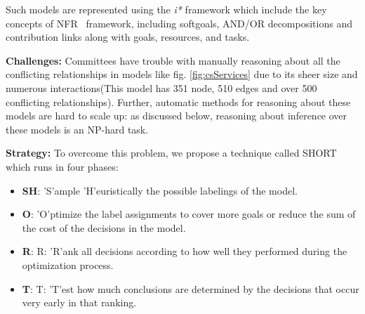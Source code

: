 \documentclass[table, xcdraw, sigconf,review, anonymous]{acmart}
\begin{document}
Such models are represented using the \textit{i*} framework \cite{yu97a} which include the key concepts of NFR~\cite{mylopoulos92.nfr} framework, including softgoals, AND/OR decompositions and contribution links along with goals, resources, and tasks. 


\noindent\textbf{Challenges: } Committees have trouble with manually reasoning about all the conflicting relationships in models like fig. \ref{fig:csServices} due to its sheer size and numerous interactions(This model has 351 node, 510 edges and over 500 conflicting relationships). Further, automatic methods for reasoning about these models are hard to scale up: as discussed below, reasoning about inference over these models is an NP-hard task. 

\noindent\textbf{Strategy:} To overcome this problem, we propose a technique called SHORT which runs in four phases:
\begin{itemize}
    \item{\textbf{SH}: 'S'ample 'H'euristically the possible labelings of the model.}
    \item{\textbf{O}: 'O'ptimize the label assignments to cover more goals or reduce the sum of the cost of the decisions in the model.}
    \item{\textbf{R}: R: 'R'ank all decisions according to how well they performed during the optimization process.}
    \item{\textbf{T}: T: 'T'est how much conclusions are determined by the decisions that occur very early in that ranking.}
\end{itemize}
\end{document}
